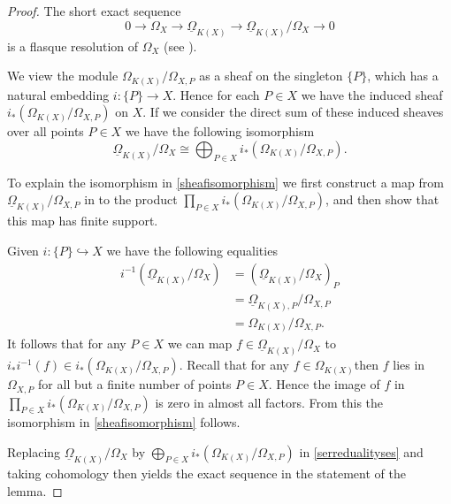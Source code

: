 \documentclass[draft, 11pt]{article} %
\theoremstyle{plain}
\theoremstyle{remark}
\begin{document}
\begin{proof}
The short exact sequence
\begin{equation}\label{serredualityses}
0 \rightarrow \Omega_X \rightarrow \underline{\Omega}_{K(X)} \rightarrow \underline{\Omega}_{K(X)}/\Omega_X \rightarrow 0
\end{equation}
is a flasque resolution of $\Omega_X$ (see \cite[Chap II, ex. 1.16]{hart}).

We view the module $\Omega_{K(X)}/\Omega_{X,P}$ as a sheaf on the singleton $\{P\}$, which has a natural embedding $i\colon \{P\} \rightarrow X$.
Hence for each $P\in X$ we have the induced sheaf $i_*\left(\Omega_{K(X)}/\Omega_{X,P}\right)$ on $X$.
If we consider the direct sum of these induced sheaves over all points $P\in X$ we have the following isomorphism
\begin{equation}\label{sheafisomorphism}
\underline{\Omega}_{K(X)}/\Omega_X\cong \bigoplus_{P\in X} i_*\left(\Omega_{K(X)}/\Omega_{X,P}\right).
\end{equation}


To explain the isomorphism in \eqref{sheafisomorphism} we first construct a map from $\underline{\Omega}_{K(X)}/\Omega_{X,P}$ in to the product $\prod_{P \in X} i_*\left(\Omega_{K(X)}/\Omega_{X,P}\right)$, and then show that this map has finite support.

Given $i\colon \{P\} \hookrightarrow X$ we have the following equalities
\begin{align*}
i^{-1}\left(\underline{\Omega}_{K(X)}/\Omega_X\right) & = \left(\underline{\Omega}_{K(X)}/\Omega_X\right)_P \\
& = \underline{\Omega}_{K(X),P}/\Omega_{X,P} \\
& = \Omega_{K(X)}/\Omega_{X,P}.
\end{align*}
It follows that for any $P \in X$ we can map $f \in \underline{\Omega}_{K(X)}/\Omega_X$ to $i_*i^{-1}(f) \in i_* \left( \Omega_{K(X)}/\Omega_{X,P} \right)$.
Recall that for any $f \in \Omega_{K(X)}$then $f$ lies in $\Omega_{X,P}$ for all but a finite number of points $P \in X$.
Hence the image of $f$ in $\prod_{P \in X} i_*\left(\Omega_{K(X)}/\Omega_{X,P}\right)$ is zero in almost all factors.
From this the isomorphism in \eqref{sheafisomorphism} follows.

Replacing $\underline{\Omega}_{K(X)}/\Omega_X$ by $\bigoplus_{P\in X} i_*\left(\Omega_{K(X)}/\Omega_{X,P}\right)$ in \eqref{serredualityses} and taking cohomology then yields the exact sequence in the statement of the lemma.
\end{proof}
\end{document}
